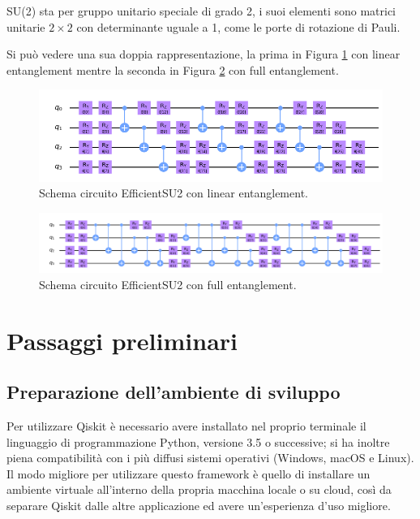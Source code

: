 SU(2) sta per gruppo unitario speciale di grado 2, i suoi elementi sono matrici unitarie $2\times2$ con determinante uguale a 1, come le porte di rotazione di Pauli.

Si può vedere una sua doppia rappresentazione, la prima in Figura \ref{fig:circuito_efficientsu2_linear} con linear entanglement mentre la seconda in Figura \ref{fig:circuito_efficientsu2_full} con full entanglement.
\begin{figure}[htp]
    \centering
    \includegraphics[width=12cm]{Images/Capitolo3/circuito_efficientsu2_linear.png}
    \caption{Schema circuito EfficientSU2 con linear entanglement.}
    \label{fig:circuito_efficientsu2_linear}
\end{figure}
\begin{figure}[htp]
    \centering
    \includegraphics[width=13cm]{Images/Capitolo3/circuito_efficientsu2_full.png}
    \caption{Schema circuito EfficientSU2 con full entanglement.}
    \label{fig:circuito_efficientsu2_full}
\end{figure}
\newline

\section{Passaggi preliminari}
\subsection{Preparazione dell'ambiente di sviluppo}
Per utilizzare Qiskit è necessario avere installato nel proprio terminale il linguaggio di programmazione Python, versione 3.5 o successive; si ha inoltre piena compatibilità con i più diffusi sistemi operativi (Windows, macOS e Linux).
Il modo migliore per utilizzare questo framework è quello di installare un ambiente virtuale all'interno della propria macchina locale o su cloud, così da separare Qiskit dalle altre applicazione ed avere un'esperienza d'uso migliore.

